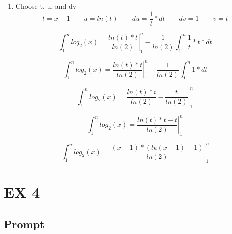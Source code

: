 \documentclass[10pt,a4paper]{article}
\theoremstyle{definition}
\newcommand*\Eval[3]{\left.#1\right\rvert_{#2}^{#3}}
\begin{document}
\begin{enumerate}
  \item Choose t, u, and dv
  \begin{equation}
    t = x-1 \qquad u = ln(t) \qquad du = \frac{1}{t}*dt \qquad dv = 1 \qquad v = t
  \end{equation}

  \begin{equation*}
    \int_1^n log_2(x) = \Eval{\frac{ln(t)*t}{ln(2)}}{1}{n} - \frac{1}{ln(2)}\int_1^n \frac{1}{t}*t * dt
  \end{equation*}

  \begin{equation*}
    \int_1^n log_2(x) = \Eval{\frac{ln(t)*t}{ln(2)}}{1}{n} - \frac{1}{ln(2)}\int_1^n 1*dt
  \end{equation*}

  \begin{equation*}
    \int_1^n log_2(x) = \Eval{\frac{ln(t)*t}{ln(2)} - \frac{t}{ln(2)}}{1}{n}
  \end{equation*}

  \begin{equation*}
    \int_1^n log_2(x) = \Eval{\frac{ln(t)*t-t}{ln(2)}}{1}{n}
  \end{equation*}

  \begin{equation*}
    \int_1^n log_2(x) = \Eval{\frac{(x-1)*(ln(x-1)-1)}{ln(2)}}{1}{n}
  \end{equation*}

\end{enumerate}
\section{EX 4}
\subsection{Prompt}
\end{document}
